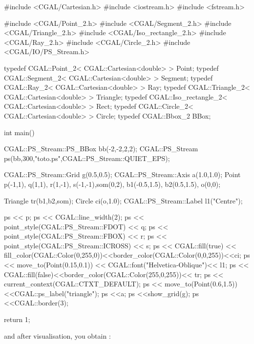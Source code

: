 \begin{cprog}

#include <CGAL/Cartesian.h>
#include <iostream.h>
#include <fstream.h>

#include <CGAL/Point_2.h>
#include <CGAL/Segment_2.h>
#include <CGAL/Triangle_2.h>
#include <CGAL/Iso_rectangle_2.h>
#include <CGAL/Ray_2.h>
#include <CGAL/Circle_2.h>
#include <CGAL/IO/PS_Stream.h>

typedef CGAL::Point_2< CGAL::Cartesian<double> >     Point;
typedef CGAL::Segment_2< CGAL::Cartesian<double> >   Segment;
typedef CGAL::Ray_2< CGAL::Cartesian<double> >       Ray;
typedef CGAL::Triangle_2< CGAL::Cartesian<double> >  Triangle;
typedef CGAL::Iso_rectangle_2< CGAL::Cartesian<double> > Rect;
typedef CGAL::Circle_2< CGAL::Cartesian<double> >    Circle;
typedef CGAL::Bbox_2 BBox;

int  main()
{

CGAL::PS_Stream::PS_BBox bb(-2,-2,2,2);
CGAL::PS_Stream ps(bb,300,"toto.ps",CGAL::PS_Stream::QUIET_EPS);

CGAL::PS_Stream::Grid g(0.5,0.5);
CGAL::PS_Stream::Axis a(1.0,1.0);
Point p(-1,1), q(1,1), r(1,-1), s(-1,-1),som(0,2), b1(-0.5,1.5),
   b2(0.5,1.5), o(0,0);

Triangle tr(b1,b2,som);
Circle ci(o,1.0);
CGAL::PS_Stream::Label l1("Centre");

ps << p;
ps << CGAL::line_width(2);    
ps << point_style(CGAL::PS_Stream::FDOT) << q;
ps << point_style(CGAL::PS_Stream::FBOX) << r;
ps << point_style(CGAL::PS_Stream::ICROSS) << s;
 ps << CGAL::fill(true) <<
fill_color(CGAL::Color(0,255,0))<<border_color(CGAL::Color(0,0,255))<<ci;
ps << move_to(Point(0.15,0.1)) << CGAL::font("Helvetica-Oblique")<< l1;
ps << CGAL::fill(false)<<border_color(CGAL::Color(255,0,255))<< tr;
ps << current_context(CGAL::CTXT_DEFAULT);
ps << move_to(Point(0.6,1.5)) <<CGAL::ps_label("triangle");
ps <<a;
ps <<show_grid(g);
ps <<CGAL::border(3);

return 1;
}


\end{cprog}

and after visualisation, you obtain :\\
\\

